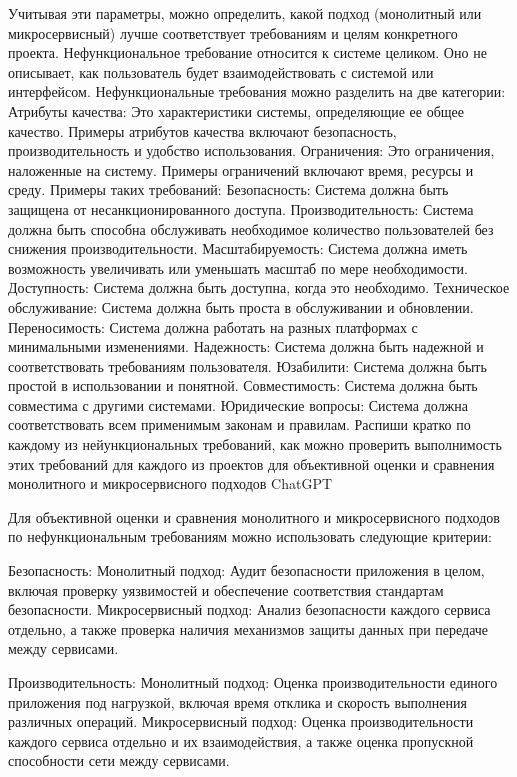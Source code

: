 Учитывая эти параметры, можно определить, какой подход (монолитный или микросервисный) лучше соответствует требованиям и целям конкретного проекта.
Нефункциональное требование относится к системе целиком. Оно не описывает, как пользователь будет взаимодействовать с системой или интерфейсом. Нефункциональные требования можно разделить на две категории: Атрибуты качества: Это характеристики системы, определяющие ее общее качество. Примеры атрибутов качества включают безопасность, производительность и удобство использования. Ограничения: Это ограничения, наложенные на систему. Примеры ограничений включают время, ресурсы и среду. Примеры таких требований: Безопасность: Система должна быть защищена от несанкционированного доступа. Производительность: Система должна быть способна обслуживать необходимое количество пользователей без снижения производительности. Масштабируемость: Система должна иметь возможность увеличивать или уменьшать масштаб по мере необходимости. Доступность: Система должна быть доступна, когда это необходимо. Техническое обслуживание: Система должна быть проста в обслуживании и обновлении. Переносимость: Система должна работать на разных платформах с минимальными изменениями. Надежность: Система должна быть надежной и соответствовать требованиям пользователя. Юзабилити: Система должна быть простой в использовании и понятной. Совместимость: Система должна быть совместима с другими системами. Юридические вопросы: Система должна соответствовать всем применимым законам и правилам. Распиши кратко по каждому из нейункциональных требований, как можно проверить выполнимость этих требований для каждого из проектов для объективной оценки и сравнения монолитного и микросервисного подходов
ChatGPT

Для объективной оценки и сравнения монолитного и микросервисного подходов по нефункциональным требованиям можно использовать следующие критерии:

    Безопасность:
        Монолитный подход: Аудит безопасности приложения в целом, включая проверку уязвимостей и обеспечение соответствия стандартам безопасности.
        Микросервисный подход: Анализ безопасности каждого сервиса отдельно, а также проверка наличия механизмов защиты данных при передаче между сервисами.

    Производительность:
        Монолитный подход: Оценка производительности единого приложения под нагрузкой, включая время отклика и скорость выполнения различных операций.
        Микросервисный подход: Оценка производительности каждого сервиса отдельно и их взаимодействия, а также оценка пропускной способности сети между сервисами.

